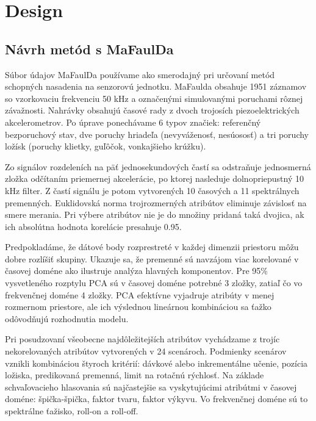 \chapter{Design} \label{chapter:design}








\section{Návrh metód s MaFaulDa}
Súbor údajov MaFaulDa používame ako smerodajný pri určovaní metód schopných nasadenia na senzorovú jednotku. MaFaulda obsahuje 1951 záznamov so vzorkovaciu frekvenciu 50 kHz a označenými simulovanými poruchami rôznej závažnosti. Nahrávky obsahujú časové rady z dvoch trojosích piezoelektrických akcelerometrov. Po úprave ponechávame 6 typov značiek: referenčný bezporuchový stav, dve poruchy hriadeľa (nevyváženosť, nesúososť) a tri poruchy ložísk (poruchy klietky, guľôčok, vonkajšieho krúžku). 

Zo signálov rozdeleních na päť jednosekundových častí sa odstraňuje jednosmerná zložka odčítaním priemernej akcelerácie, po ktorej nasleduje dolnopriepustný 10 kHz filter. Z častí signálu je potom vytvorených 10 časových a 11 spektrálnych premenných. Euklidovská norma trojrozmerných atribútov eliminuje závislosť na smere merania. Pri výbere atribútov nie je do množiny pridaná taká dvojica, ak ich absolútna hodnota korelácie presahuje 0.95.

Predpokladáme, že dátové body rozprestreté v každej dimenzii priestoru môžu dobre rozlíšiť skupiny. Ukazuje sa, že premenné sú navzájom viac korelované v časovej doméne ako ilustruje analýza hlavných komponentov. Pre 95\% vysvetleného rozptylu PCA sú v časovej doméne potrebné 3 zložky, zatiaľ čo vo frekvenčnej doméne 4 zložky. PCA efektívne vyjadruje atribúty v menej rozmernom priestore, ale ich výslednou lineárnou kombináciou sa ťažko odôvodňujú rozhodnutia modelu.

Pri posudzovaní všeobecne najdôležitejších atribútov vychádzame z trojíc nekorelovaných atribútov vytvorených v 24 scenároch. Podmienky scenárov vznikli kombináciou štyroch kritérií: dávkové alebo inkrementálne učenie, pozícia ložiska, predikovaná premenná, limit na rotačnú rýchlosť. Na základe schvaľovacieho hlasovania sú najčastejšie sa vyskytujúcimi atribútmi v časovej doméne: špička-špička, faktor tvaru, faktor výkyvu. Vo frekvenčnej doméne sú to spektrálne ťažisko, roll-on a roll-off.

